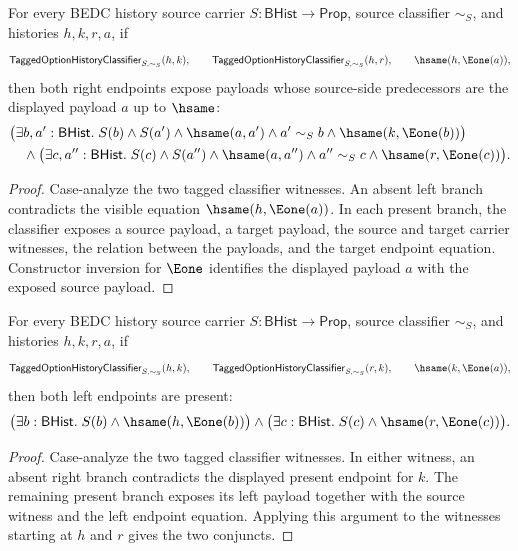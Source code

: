 \begin{theorem}
\label{thm:tagged-option-history-classifier-left-present-payload-fanout}
For every BEDC history source carrier $S:\mathsf{BHist}\to\mathsf{Prop}$,
source classifier $\sim_S$, and histories $h,k,r,a$, if
$$
\mathsf{TaggedOptionHistoryClassifier}_{S,\sim_S}(h,k),\qquad
\mathsf{TaggedOptionHistoryClassifier}_{S,\sim_S}(h,r),\qquad
\hsame(h,\Eone(a)),
$$
then both right endpoints expose payloads whose source-side predecessors are
the displayed payload $a$ up to $\hsame$:
$$
\begin{aligned}
&\bigl(\exists b,a':\mathsf{BHist}.\;
S(b)\land S(a')\land\hsame(a,a')\land a'\sim_S b
\land\hsame(k,\Eone(b))\bigr)\\
&\quad\land
\bigl(\exists c,a'':\mathsf{BHist}.\;
S(c)\land S(a'')\land\hsame(a,a'')\land a''\sim_S c
\land\hsame(r,\Eone(c))\bigr).
\end{aligned}
$$
\end{theorem}
\begin{proof}
Case-analyze the two tagged classifier witnesses. An absent left branch
contradicts the visible equation $\hsame(h,\Eone(a))$. In each present branch,
the classifier exposes a source payload, a target payload, the source and target
carrier witnesses, the relation between the payloads, and the target endpoint
equation. Constructor inversion for $\Eone$ identifies the displayed payload
$a$ with the exposed source payload.
\end{proof}

\begin{theorem}
\label{thm:tagged-option-history-classifier-right-present-endpoint-fanout}
For every BEDC history source carrier $S:\mathsf{BHist}\to\mathsf{Prop}$,
source classifier $\sim_S$, and histories $h,k,r,a$, if
$$
\mathsf{TaggedOptionHistoryClassifier}_{S,\sim_S}(h,k),\qquad
\mathsf{TaggedOptionHistoryClassifier}_{S,\sim_S}(r,k),\qquad
\hsame(k,\Eone(a)),
$$
then both left endpoints are present:
$$
\bigl(\exists b:\mathsf{BHist}.\;S(b)\land\hsame(h,\Eone(b))\bigr)
\land
\bigl(\exists c:\mathsf{BHist}.\;S(c)\land\hsame(r,\Eone(c))\bigr).
$$
\end{theorem}
\begin{proof}
Case-analyze the two tagged classifier witnesses. In either witness, an absent
right branch contradicts the displayed present endpoint for $k$. The remaining
present branch exposes its left payload together with the source witness and
the left endpoint equation. Applying this argument to the witnesses starting at
$h$ and $r$ gives the two conjuncts.
\end{proof}


